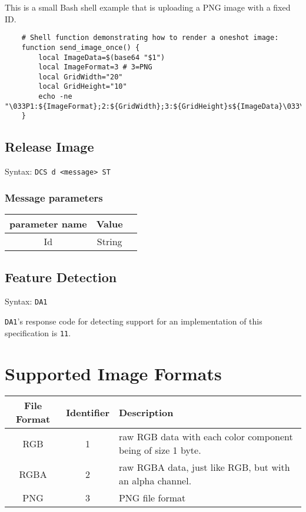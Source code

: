 \documentclass[a4paper]{article}
\newcommand{\code}[1]{\colorbox{light-gray}{\texttt{#1}}}
\newcommand{\DA}{\code{DA1}}
\begin{document}
This is a small Bash shell example that is uploading a PNG image with a fixed ID.

\begin{verbatim}
    # Shell function demonstrating how to render a oneshot image:
    function send_image_once() {
        local ImageData=$(base64 "$1")
        local ImageFormat=3 # 3=PNG
        local GridWidth="20"
        local GridHeight="10"
        echo -ne "\033P1:${ImageFormat};2:${GridWidth};3:${GridHeight}s${ImageData}\033\\"
    }
\end{verbatim}

\subsection{Release Image} %

Syntax: \code{DCS d <message> ST}

\subsubsection*{Message parameters}

\begin{tabular}{ |c|c|l| }
    \hline
    \textbf{parameter name}   & \textbf{Value} \\
    \hline
    Id          & String \\
    \hline
\end{tabular}

\subsection{Feature Detection} %

Syntax: \DA

\DA's response code for detecting support for an implementation of this specification is \code{11}.

\section{Supported Image Formats} %

\label{sec:supported-image-formtats}

\begin{tabular}{c | c | l}
    File Format & Identifier & Description \\ \hline
    RGB         & 1          & raw RGB data with each color component being of size 1 byte. \\
    RGBA        & 2          & raw RGBA data, just like RGB, but with an alpha channel. \\
    PNG         & 3          & PNG file format \\
\end{tabular}
\end{document}
